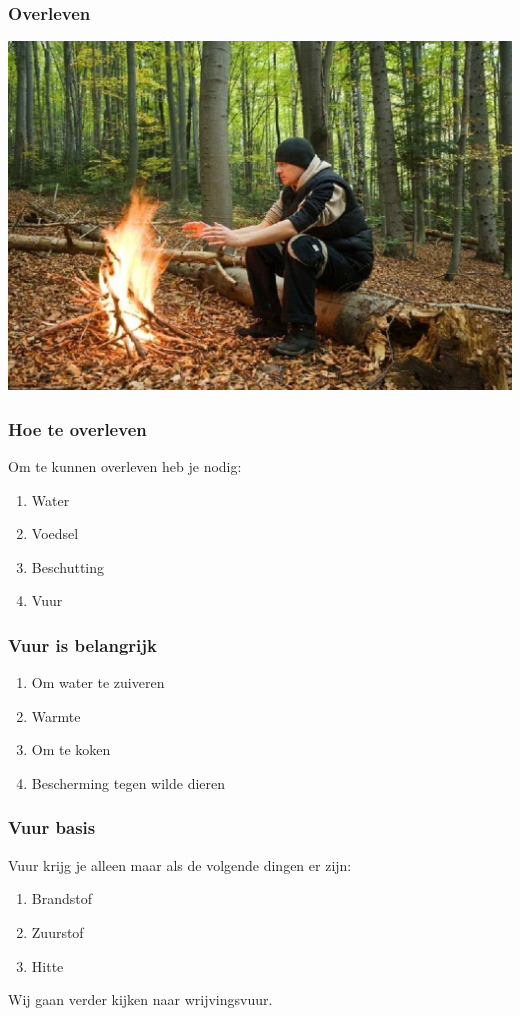 \documentclass[a4paper, handout]{beamer}
\begin{document}
\begin{frame}
	\frametitle{Overleven}
	\includegraphics[width=\linewidth]{man-bij-vuur}
\end{frame}
\begin{frame}
	\frametitle{Hoe te overleven}
	Om te kunnen overleven heb je nodig:
	\begin{enumerate}
		\item{Water}
		\item{Voedsel}
		\item{Beschutting}
		\item{Vuur}
	\end{enumerate}
\end{frame}

\begin{frame}
	\frametitle{Vuur is belangrijk}
	\begin{enumerate}
		\item{Om water te zuiveren}
		\item{Warmte}
		\item{Om te koken}
		\item{Bescherming tegen wilde dieren}
	\end{enumerate}
\end{frame}

\begin{frame}
	\frametitle{Vuur basis}
	Vuur krijg je alleen maar als de volgende dingen er zijn:
	\begin{enumerate}
		\item{Brandstof}
		\item{Zuurstof}
		\item{Hitte}
	\end{enumerate}
	Wij gaan verder kijken naar wrijvingsvuur.
\end{frame}
\end{document}
